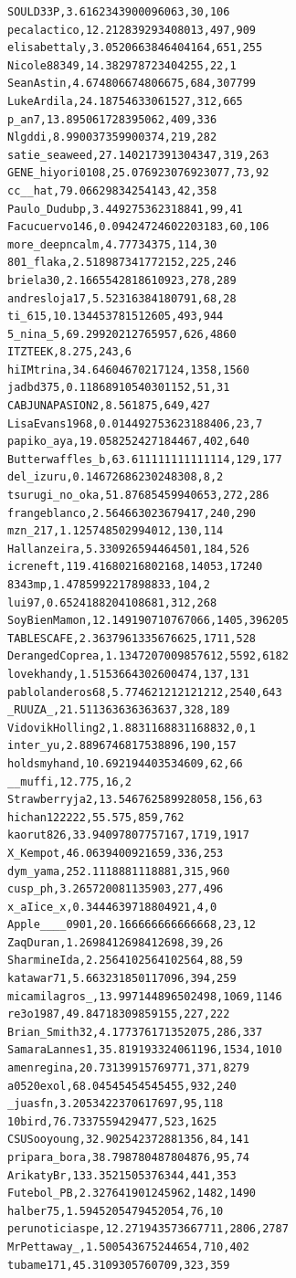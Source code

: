 \begin{verbatim}
SOULD33P,3.6162343900096063,30,106
pecalactico,12.212839293408013,497,909
elisabettaly,3.0520663846404164,651,255
Nicole88349,14.382978723404255,22,1
SeanAstin,4.674806674806675,684,307799
LukeArdila,24.18754633061527,312,665
p_an7,13.895061728395062,409,336
Nlgddi,8.990037359900374,219,282
satie_seaweed,27.140217391304347,319,263
GENE_hiyori0108,25.076923076923077,73,92
cc__hat,79.06629834254143,42,358
Paulo_Dudubp,3.449275362318841,99,41
Facucuervo146,0.09424724602203183,60,106
more_deepncalm,4.77734375,114,30
801_flaka,2.518987341772152,225,246
briela30,2.1665542818610923,278,289
andresloja17,5.52316384180791,68,28
ti_615,10.134453781512605,493,944
5_nina_5,69.29920212765957,626,4860
ITZTEEK,8.275,243,6
hiIMtrina,34.64604670217124,1358,1560
jadbd375,0.11868910540301152,51,31
CABJUNAPASION2,8.561875,649,427
LisaEvans1968,0.014492753623188406,23,7
papiko_aya,19.058252427184467,402,640
Butterwaffles_b,63.611111111111114,129,177
del_izuru,0.14672686230248308,8,2
tsurugi_no_oka,51.87685459940653,272,286
frangeblanco,2.564663023679417,240,290
mzn_217,1.125748502994012,130,114
Hallanzeira,5.330926594464501,184,526
icreneft,119.41680216802168,14053,17240
8343mp,1.4785992217898833,104,2
lui97,0.6524188204108681,312,268
SoyBienMamon,12.149190710767066,1405,396205
TABLESCAFE,2.3637961335676625,1711,528
DerangedCoprea,1.1347207009857612,5592,6182
lovekhandy,1.5153664302600474,137,131
pablolanderos68,5.774621212121212,2540,643
_RUUZA_,21.511363636363637,328,189
VidovikHolling2,1.8831168831168832,0,1
inter_yu,2.8896746817538896,190,157
holdsmyhand,10.692194403534609,62,66
__muffi,12.775,16,2
Strawberryja2,13.546762589928058,156,63
hichan122222,55.575,859,762
kaorut826,33.94097807757167,1719,1917
X_Kempot,46.0639400921659,336,253
dym_yama,252.1118881118881,315,960
cusp_ph,3.265720081135903,277,496
x_aIice_x,0.3444639718804921,4,0
Apple____0901,20.166666666666668,23,12
ZaqDuran,1.2698412698412698,39,26
SharmineIda,2.2564102564102564,88,59
katawar71,5.663231850117096,394,259
micamilagros_,13.997144896502498,1069,1146
re3o1987,49.84718309859155,227,222
Brian_Smith32,4.177376171352075,286,337
SamaraLannes1,35.819193324061196,1534,1010
amenregina,20.73139915769771,371,8279
a0520exol,68.04545454545455,932,240
_juasfn,3.2053422370617697,95,118
10bird,76.7337559429477,523,1625
CSUSooyoung,32.902542372881356,84,141
pripara_bora,38.798780487804876,95,74
ArikatyBr,133.3521505376344,441,353
Futebol_PB,2.327641901245962,1482,1490
halber75,1.5945205479452054,76,10
perunoticiaspe,12.271943573667711,2806,2787
MrPettaway_,1.500543675244654,710,402
tubame171,45.3109305760709,323,359

\end{verbatim}
